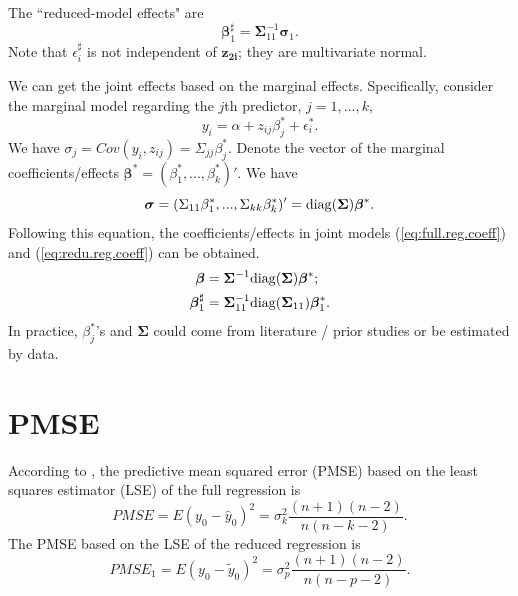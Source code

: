 \documentclass[11pt]{article}
\begin{document}
The ``reduced-model effects" are 
\begin{equation}
\label{eq:redu.reg.coeff}
\boldsymbol{\beta}_1^\sharp = \boldsymbol{\Sigma}_{11}^{-1}\boldsymbol{\sigma}_1.
\end{equation}
Note that $\epsilon_i^\sharp$ is not independent of $\boldsymbol{z_{2i}}$; they are multivariate normal.

We can get the joint effects based on the marginal effects. Specifically, consider the marginal model regarding the $j$th predictor, $j=1, ..., k$, 
$$
y_i = \alpha + z_{ij}\beta_j^* + \epsilon_i^*.
$$
We have $\sigma_j = Cov(y_i, z_{ij}) = \Sigma_{jj} \beta_j^*$. 
Denote the vector of the marginal coefficients/effects $\boldsymbol{\beta}^* = (\beta_1^*, ..., \beta_k^*)'$. We have
\begin{equation}
\label{eq:cov-y-Z}
\boldsymbol{\sigma} = (\Sigma_{11}\beta^*_1, ...,  \Sigma_{kk}\beta^*_k)' = {\rm diag}(\boldsymbol{\Sigma})\boldsymbol{\beta}^*.
\end{equation}
Following this equation, the coefficients/effects in joint models (\ref{eq:full.reg.coeff}) and (\ref{eq:redu.reg.coeff}) can be obtained. 
\begin{align}
\label{eq:jointBetaByMarg}
\boldsymbol{\beta} &= \boldsymbol{\Sigma}^{-1}{\rm diag}(\boldsymbol{\Sigma})\boldsymbol{\beta}^*; \\
\boldsymbol{\beta}_1^\sharp &= \boldsymbol{\Sigma}_{11}^{-1} {\rm diag}(\boldsymbol{\Sigma}_{11})\boldsymbol{\beta}^*_1.
\end{align}
In practice, $\beta_j^*$'s and $\boldsymbol{\Sigma}$ could come from literature / prior studies or be estimated by data. 





\section{PMSE}

According to \cite{narula1974predictive}, the predictive mean squared error (PMSE) based on the least squares estimator (LSE) of the full regression is 
$$
PMSE = E(y_0 - \hat{y}_0)^2 = \sigma_k^2 \frac{(n+1)(n-2)}{n(n-k-2)}.
$$
The PMSE based on the LSE of the reduced regression is 
$$
PMSE_1 = E(y_0 - \tilde{y}_0)^2 = \sigma_p^2 \frac{(n+1)(n-2)}{n(n-p-2)}.
$$
\end{document}
